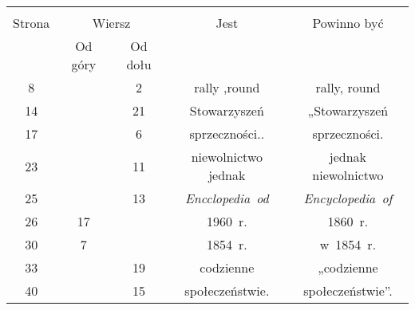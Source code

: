 \documentclass[a4paper,11pt]{article}
\begin{document}







\begin{center}

  \begin{tabular}{|c|c|c|c|c|}
    \hline
    & \multicolumn{2}{c|}{} & & \\
    Strona & \multicolumn{2}{c|}{Wiersz} & Jest
                              & Powinno być \\ \cline{2-3}
    & Od góry & Od dołu & & \\
    \hline
    8   & &  2 & rally ,round & rally, round \\
    14  & & 21 & Stowarzyszeń & „Stowarzyszeń \\
    17  & &  6 & sprzeczności.. & sprzeczności. \\
    23  & & 11 & niewolnictwo jednak & jednak niewolnictwo \\
    25  & & 13 & \textit{Encclopedia~od} & \textit{Encyclopedia~of} \\
    26  & 17 & & 1960~r. & 1860~r. \\
    30  &  7 & & 1854~r. & w~1854~r. \\
    33  & & 19 & codzienne & „codzienne \\
    40  & & 15 & społeczeństwie. & społeczeństwie”. \\
    \hline
  \end{tabular}






\end{center}
\end{document}
